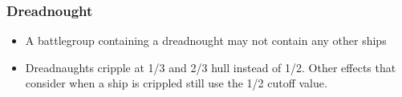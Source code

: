 \subsubsection{Dreadnought}
\begin{itemize}
\item A battlegroup containing a dreadnought may not contain any other ships
\item Dreadnaughts cripple at 1/3 and 2/3 hull instead of 1/2. Other effects that consider when a ship is crippled still use the 1/2 cutoff value. 
\end{itemize}
